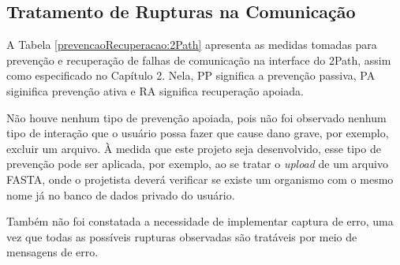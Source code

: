 \subsection{Tratamento de Rupturas na Comunicação}

\indent A Tabela \ref{prevencaoRecuperacao:2Path} apresenta as medidas tomadas para prevenção e recuperação de falhas de comunicação na interface do 2Path, assim como especificado no Capítulo 2. Nela, PP significa a prevenção passiva, PA siginifica prevenção ativa e RA significa recuperação apoiada. 

\indent Não houve nenhum tipo de prevenção apoiada, pois não foi observado nenhum tipo de interação que o usuário possa fazer que cause dano grave, por exemplo, excluir um arquivo. À medida que este projeto seja desenvolvido, esse tipo de prevenção pode ser aplicada, por exemplo, ao se tratar o \textit{upload} de um arquivo FASTA, onde o projetista deverá verificar se existe um organismo com o mesmo nome já no banco de dados privado do usuário. 

\indent Também não foi constatada a necessidade de implementar captura de erro, uma vez que todas as possíveis rupturas observadas são tratáveis por meio de mensagens de erro.

